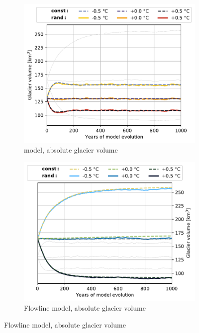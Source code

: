 \begin{figure}[t!]
\begin{subfigure}[b]{0.48\textwidth}
          \end{subfigure}
          \begin{subfigure}[b]{0.48\textwidth}
            \caption{\Vas{} model, absolute glacier volume}
            \label{fig:histalp_commitment:volume_abs_const}
            \centering
            \includegraphics[width=\textwidth]{../plots/final_plots/time_series/histalp_commitment/volume_abs_vas.pdf}
          \end{subfigure}
          \hfill
          \begin{subfigure}[b]{0.48\textwidth}
            \caption{Flowline model, absolute glacier volume}
            \label{fig:histalp_commitment:volume_abs_random}
            \centering
            \includegraphics[width=\textwidth]{../plots/final_plots/time_series/histalp_commitment/volume_abs_fl.pdf}
          \end{subfigure}
          

\end{figure}
